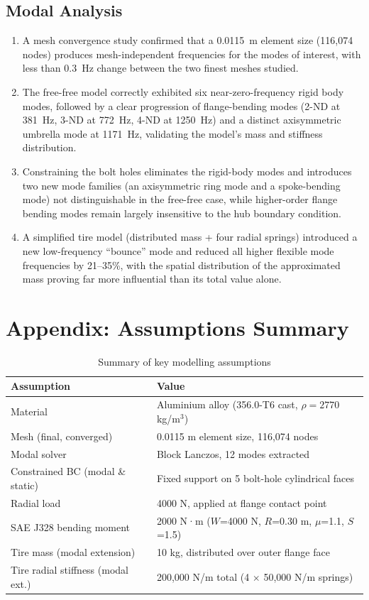 \documentclass[11pt]{article}
\begin{document}
\subsection{Modal Analysis}

\begin{enumerate}
    \item A mesh convergence study confirmed that a 0.0115~m element size
    (116{,}074 nodes) produces mesh-independent frequencies for the modes of interest,
    with less than 0.3~Hz change between the two finest meshes studied.
    \item The free-free model correctly exhibited six near-zero-frequency rigid body
    modes, followed by a clear progression of flange-bending modes (2-ND at 381~Hz,
    3-ND at 772~Hz, 4-ND at 1250~Hz) and a distinct axisymmetric umbrella mode at
    1171~Hz, validating the model's mass and stiffness distribution.
    \item Constraining the bolt holes eliminates the rigid-body modes and introduces
    two new mode families (an axisymmetric ring mode and a spoke-bending mode) not
    distinguishable in the free-free case, while higher-order flange bending modes
    remain largely insensitive to the hub boundary condition.
    \item A simplified tire model (distributed mass + four radial springs) introduced
    a new low-frequency ``bounce'' mode and reduced all higher flexible mode
    frequencies by 21--35\%, with the spatial distribution of the approximated mass
    proving far more influential than its total value alone.
\end{enumerate}

\section*{Appendix: Assumptions Summary}

\begin{table}[H]
\centering
\caption{Summary of key modelling assumptions}
\begin{tabular}{ll}
\toprule
\textbf{Assumption} & \textbf{Value} \\
\midrule
Material & Aluminium alloy (356.0-T6 cast, $\rho=2770$ kg/m$^3$) \\
Mesh (final, converged) & 0.0115 m element size, 116{,}074 nodes \\
Modal solver & Block Lanczos, 12 modes extracted \\
Constrained BC (modal \& static) & Fixed support on 5 bolt-hole cylindrical faces \\
Radial load & 4000 N, applied at flange contact point \\
SAE J328 bending moment & 2000 N·m ($W$=4000 N, $R$=0.30 m, $\mu$=1.1, $S$=1.5) \\
Tire mass (modal extension) & 10 kg, distributed over outer flange face \\
Tire radial stiffness (modal ext.) & 200{,}000 N/m total (4 $\times$ 50{,}000 N/m springs) \\
\bottomrule
\end{tabular}
\end{table}
\end{document}

